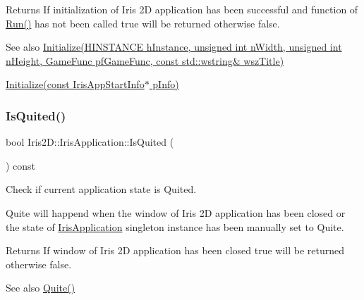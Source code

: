 \begin{DoxyReturn}{Returns}
If initialization of Iris 2D application has been successful and function of \hyperlink{class_iris2_d_1_1_iris_application_ae6bb59365978c945201fd8cf82105e4f}{Run()} has not been called true will be returned otherwise false. 
\end{DoxyReturn}
\begin{DoxySeeAlso}{See also}
\hyperlink{class_iris2_d_1_1_iris_application_a84f3ddebb3a3ffb0c172bd41fb952e1a}{Initialize(\+H\+I\+N\+S\+T\+A\+N\+C\+E h\+Instance, unsigned int n\+Width, unsigned int n\+Height, Game\+Func pf\+Game\+Func, const std\+::wstring\& wsz\+Title)} 

\hyperlink{class_iris2_d_1_1_iris_application_ac20656815694f980fccfc4369727a9a9}{Initialize(const Iris\+App\+Start\+Info$\ast$ p\+Info)} 
\end{DoxySeeAlso}
\mbox{\label{class_iris2_d_1_1_iris_application_ae9760ff496a4c80f96ad49331407c2e4}} 
\subsubsection{\texorpdfstring{Is\+Quited()}{IsQuited()}}
{\footnotesize\ttfamily bool Iris2\+D\+::\+Iris\+Application\+::\+Is\+Quited (\begin{DoxyParamCaption}{ }\end{DoxyParamCaption}) const}



Check if current application state is Quited. 

Quite will happend when the window of Iris 2D application has been closed or the state of \hyperlink{class_iris2_d_1_1_iris_application}{Iris\+Application} singleton instance has been manually set to Quite. \begin{DoxyReturn}{Returns}
If window of Iris 2D application has been closed true will be returned otherwise false. 
\end{DoxyReturn}
\begin{DoxySeeAlso}{See also}
\hyperlink{class_iris2_d_1_1_iris_application_adca8cada1a8841c3f409e856f6878331}{Quite()} 
\end{DoxySeeAlso}
\mbox{\label{class_iris2_d_1_1_iris_application_a795cea1f5d8112a7db7d6429f306a5ff}} 
